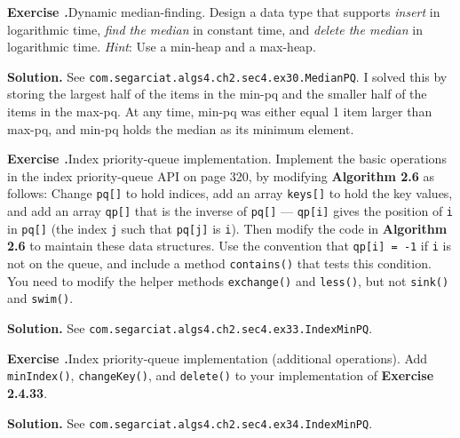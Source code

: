 \documentclass[12pt, a4paper]{article}
\newenvironment{ex}[2][Exercise]
{\par\medskip\noindent \textbf{#1 #2.}}
{\medskip}
\newenvironment{sol}[1][Solution]
{\par\medskip\noindent \textbf{#1.} }
{\medskip}
\begin{document}
	\begin{ex}{30}
		\emph{Dynamic median-finding}. Design a data type that supports \emph{insert}
		in logarithmic time, \emph{find the median} in constant time, and
		\emph{delete the median} in logarithmic time. \emph{Hint}: Use a min-heap and
		a max-heap.
	\end{ex}
	\begin{sol}
		See \texttt{com.segarciat.algs4.ch2.sec4.ex30.MedianPQ}. I solved this by
		storing the largest half of the items in the min-pq and the smaller half
		of the items in the max-pq. At any time, min-pq was either equal 1 item larger
		than max-pq, and min-pq holds the median as its minimum element. 
	\end{sol}
	\begin{ex}{33}
		\emph{Index priority-queue implementation}. Implement the basic operations in
		the index priority-queue API on page 320, by modifying \textbf{Algorithm 2.6}
		as follows: Change \texttt{pq[]} to hold indices, add an array \texttt{keys[]}
		to hold the key values, and add an array \texttt{qp[]} that is the inverse
		of \texttt{pq[]} --- \texttt{qp[i]} gives the position of \texttt{i} in
		\texttt{pq[]} (the index \texttt{j} such that \texttt{pq[j]} is \texttt{i}).
		Then modify the code in \textbf{Algorithm 2.6} to maintain these data structures.
		Use the convention that \texttt{qp[i] = -1} if \texttt{i} is not on the queue,
		and include a method \texttt{contains()} that tests this condition. You need
		to modify the helper methods \texttt{exchange()} and \texttt{less()}, but
		not \texttt{sink()} and \texttt{swim()}.
	\end{ex}
	\begin{sol}
		See \texttt{com.segarciat.algs4.ch2.sec4.ex33.IndexMinPQ}.
	\end{sol}
	\begin{ex}{34}
		\emph{Index priority-queue implementation (additional operations)}.
		Add \texttt{minIndex()}, \texttt{changeKey()}, and \texttt{delete()}
		to your implementation of \textbf{Exercise 2.4.33}.
	\end{ex}
	\begin{sol}
		See \texttt{com.segarciat.algs4.ch2.sec4.ex34.IndexMinPQ}.
	\end{sol}
	\pagebreak
	\printbibliography
\end{document}
